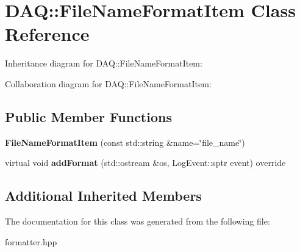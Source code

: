 \hypertarget{classDAQ_1_1FileNameFormatItem}{}\section{D\+AQ\+:\+:File\+Name\+Format\+Item Class Reference}
\label{classDAQ_1_1FileNameFormatItem}


Inheritance diagram for D\+AQ\+:\+:File\+Name\+Format\+Item\+:


Collaboration diagram for D\+AQ\+:\+:File\+Name\+Format\+Item\+:
\subsection*{Public Member Functions}
\begin{DoxyCompactItemize}
\item 
\mbox{\label{classDAQ_1_1FileNameFormatItem_aa4cf3e4501a29d0da08d02a9e0dc3d44}} 
{\bfseries File\+Name\+Format\+Item} (const std\+::string \&name=\char`\"{}file\+\_\+name\char`\"{})
\item 
\mbox{\label{classDAQ_1_1FileNameFormatItem_a37eae227af706375cd6fea74cbd97990}} 
virtual void {\bfseries add\+Format} (std\+::ostream \&os, Log\+Event\+::sptr event) override
\end{DoxyCompactItemize}
\subsection*{Additional Inherited Members}


The documentation for this class was generated from the following file\+:\begin{DoxyCompactItemize}
\item 
formatter.\+hpp\end{DoxyCompactItemize}
